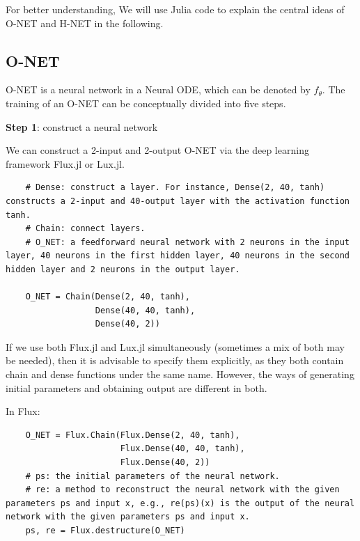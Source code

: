 \documentclass[
	parskip, 			   %
	twoside, 			   %
	DIV=14, 			   %
	BCOR=15.0mm, 		   %
	headsepline, 		   %
	open=right, 		   %
	captions=tableheading, %
	bibliography=totoc,    %
	numbers=noenddot       %
]{scrreprt}
\begin{document}
For better understanding, We will use Julia code to explain the central ideas of O-NET and H-NET in the following.

\subsection{O-NET}
O-NET is a neural network in a Neural ODE, which can be denoted by $f_{\theta}$. The training of an O-NET can be conceptually divided into five steps.

\textbf{Step 1}: construct a neural network

 We can construct a 2-input and 2-output O-NET via the deep learning framework Flux.jl or Lux.jl.
\begin{verbatim}
    # Dense: construct a layer. For instance, Dense(2, 40, tanh) constructs a 2-input and 40-output layer with the activation function tanh.
    # Chain: connect layers.
    # O_NET: a feedforward neural network with 2 neurons in the input layer, 40 neurons in the first hidden layer, 40 neurons in the second hidden layer and 2 neurons in the output layer.

    O_NET = Chain(Dense(2, 40, tanh),
                  Dense(40, 40, tanh),
                  Dense(40, 2))
\end{verbatim}

If we use both Flux.jl and Lux.jl simultaneously (sometimes a mix of both may be needed), then it is advisable to specify them explicitly, as they both contain chain and dense functions under the same name. However, the ways of generating initial parameters and obtaining output are different in both.

In Flux:
\begin{verbatim}
    O_NET = Flux.Chain(Flux.Dense(2, 40, tanh),
                       Flux.Dense(40, 40, tanh),
                       Flux.Dense(40, 2))
    # ps: the initial parameters of the neural network. 
    # re: a method to reconstruct the neural network with the given parameters ps and input x, e.g., re(ps)(x) is the output of the neural network with the given parameters ps and input x.
    ps, re = Flux.destructure(O_NET)
\end{verbatim}
\end{document}
